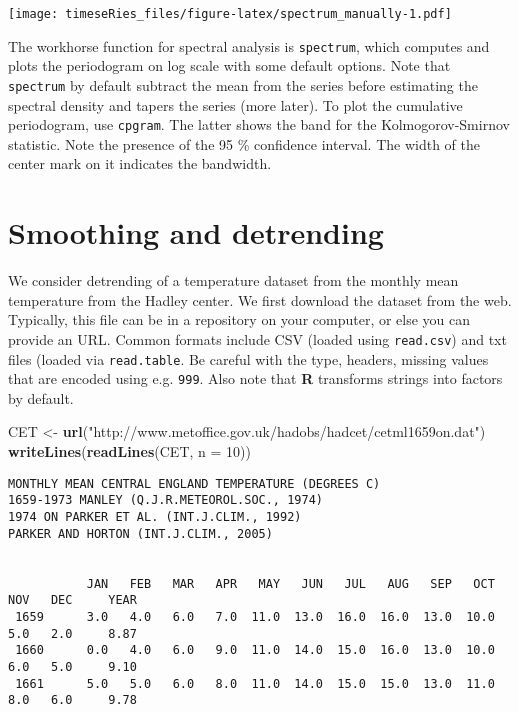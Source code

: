 \documentclass[]{book}
\newenvironment{Shaded}{\begin{snugshade}}{\end{snugshade}}
\newcommand{\DataTypeTok}[1]{\textcolor[rgb]{0.13,0.29,0.53}{#1}}
\newcommand{\DecValTok}[1]{\textcolor[rgb]{0.00,0.00,0.81}{#1}}
\newcommand{\KeywordTok}[1]{\textcolor[rgb]{0.13,0.29,0.53}{\textbf{#1}}}
\newcommand{\NormalTok}[1]{#1}
\newcommand{\StringTok}[1]{\textcolor[rgb]{0.31,0.60,0.02}{#1}}
\begin{document}
\texttt{[image: timeseRies\_files/figure-latex/spectrum\_manually-1.pdf]}

The workhorse function for spectral analysis is \texttt{spectrum}, which
computes and plots the periodogram on log scale with some default
options. Note that \texttt{spectrum} by default subtract the mean from
the series before estimating the spectral density and tapers the series
(more later). To plot the cumulative periodogram, use \texttt{cpgram}.
The latter shows the band for the Kolmogorov-Smirnov statistic. Note the
presence of the 95 \% confidence interval. The width of the center mark
on it indicates the bandwidth.

\hypertarget{smoothing-and-detrending}{%
\section{Smoothing and detrending}\label{smoothing-and-detrending}}

We consider detrending of a temperature dataset from the monthly mean
temperature from the Hadley center. We first download the dataset from
the web. Typically, this file can be in a repository on your computer,
or else you can provide an URL. Common formats include CSV (loaded using
\texttt{read.csv}) and txt files (loaded via \texttt{read.table}. Be
careful with the type, headers, missing values that are encoded using
e.g. \texttt{999}. Also note that \textbf{R} transforms strings into
factors by default.

\begin{Shaded}
\begin{Highlighting}[]
\NormalTok{CET <-}\StringTok{ }\KeywordTok{url}\NormalTok{(}\StringTok{"http://www.metoffice.gov.uk/hadobs/hadcet/cetml1659on.dat"}\NormalTok{)}
\KeywordTok{writeLines}\NormalTok{(}\KeywordTok{readLines}\NormalTok{(CET, }\DataTypeTok{n =} \DecValTok{10}\NormalTok{))}
\end{Highlighting}
\end{Shaded}

\begin{verbatim}
MONTHLY MEAN CENTRAL ENGLAND TEMPERATURE (DEGREES C)                                     
1659-1973 MANLEY (Q.J.R.METEOROL.SOC., 1974)                                             
1974 ON PARKER ET AL. (INT.J.CLIM., 1992)                                                
PARKER AND HORTON (INT.J.CLIM., 2005)                                                    
                                                                                         
                                                                                         
           JAN   FEB   MAR   APR   MAY   JUN   JUL   AUG   SEP   OCT   NOV   DEC     YEAR
 1659      3.0   4.0   6.0   7.0  11.0  13.0  16.0  16.0  13.0  10.0   5.0   2.0     8.87
 1660      0.0   4.0   6.0   9.0  11.0  14.0  15.0  16.0  13.0  10.0   6.0   5.0     9.10
 1661      5.0   5.0   6.0   8.0  11.0  14.0  15.0  15.0  13.0  11.0   8.0   6.0     9.78
\end{verbatim}
\end{document}
